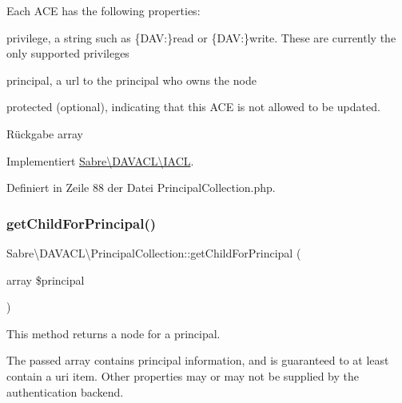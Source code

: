 Each A\+CE has the following properties\+:
\begin{DoxyItemize}
\item \textquotesingle{}privilege\textquotesingle{}, a string such as \{D\+AV\+:\}read or \{D\+AV\+:\}write. These are currently the only supported privileges
\item \textquotesingle{}principal\textquotesingle{}, a url to the principal who owns the node
\item \textquotesingle{}protected\textquotesingle{} (optional), indicating that this A\+CE is not allowed to be updated.
\end{DoxyItemize}

\begin{DoxyReturn}{Rückgabe}
array 
\end{DoxyReturn}


Implementiert \mbox{\hyperlink{interface_sabre_1_1_d_a_v_a_c_l_1_1_i_a_c_l_a8fe3b3a5b48eae789d7eb722b340045c}{Sabre\textbackslash{}\+D\+A\+V\+A\+C\+L\textbackslash{}\+I\+A\+CL}}.



Definiert in Zeile 88 der Datei Principal\+Collection.\+php.

\mbox{\label{class_sabre_1_1_d_a_v_a_c_l_1_1_principal_collection_a775f357a9c1614759355c5d771b7b9f8}} 
\subsubsection{\texorpdfstring{get\+Child\+For\+Principal()}{getChildForPrincipal()}}
{\footnotesize\ttfamily Sabre\textbackslash{}\+D\+A\+V\+A\+C\+L\textbackslash{}\+Principal\+Collection\+::get\+Child\+For\+Principal (\begin{DoxyParamCaption}\item[{array}]{\$principal }\end{DoxyParamCaption})}

This method returns a node for a principal.

The passed array contains principal information, and is guaranteed to at least contain a uri item. Other properties may or may not be supplied by the authentication backend.


